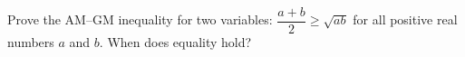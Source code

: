 Prove the AM--GM inequality for two variables: $\dfrac{a+b}{2}\ge\sqrt{ab}$ for all positive real numbers $a$ and $b$. When does equality hold?
